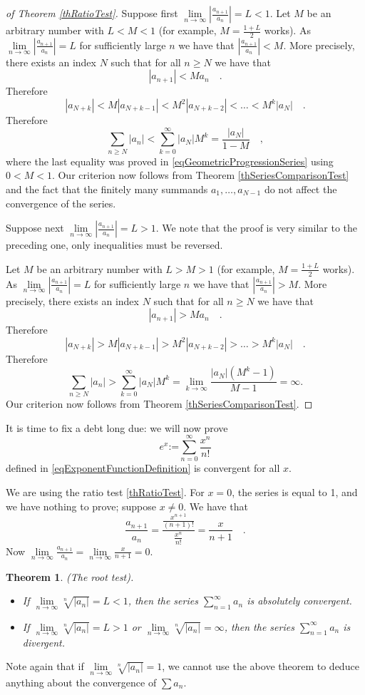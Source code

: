 \documentclass[12pt]{book}
\newcommand{\eqdef}{\textbf{:=}}
\newtheorem{theorem}{Theorem}[section]
\begin{document}
\begin{proof}[ of Theorem \ref{thRatioTest}]
Suppose first $\lim\limits_{n\to\infty}\left|\frac{a_{n+1}}{a_{n}}\right|= L<1 $. Let $M$ be an arbitrary number with $L<M<1$ (for example, $M=\frac{1+L}2$ works). As $\lim\limits_{n\to\infty}\left|\frac{a_{n+1}}{a_{n}}\right|=L$ for sufficiently large $n$ we have that $\left|\frac{a_{n+1}}{a_{n}} \right|< M$. More precisely, there exists an index $N$ such that for all $n\geq N$ we have that
\[
|a_{n+1}|< Ma_{n}\quad .
\]
Therefore
\[
|a_{N+k}|<M |a_{N+k-1}|< M^2 |a_{N+k-2}|<\dots <M^k |a_N|\quad .
\]
Therefore
\[
\sum_{n\geq N} |a_{n}|<\sum_{k=0}^{\infty} |a_N|M^{k}= \frac{|a_N|}{1-M}\quad ,
\]
where the last equality was proved in \eqref{eqGeometricProgressionSeries} using $0<M<1$. Our criterion now follows from Theorem \ref{thSeriesComparisonTest} and the fact that the finitely many summands $a_1, \dots, a_{N-1}$ do not affect the convergence of the series.

Suppose next $\lim\limits_{n\to\infty}\left|\frac{a_{n+1}}{a_{n}}\right|= L>1 $. We note that the proof is very similar to the preceding one, only inequalities must be reversed.

Let $M$ be an arbitrary number with $L>M>1$ (for example, $M=\frac{1+L}2$ works). As $\lim\limits_{n\to\infty} \left| \frac{a_{n+1}}{a_{n}} \right|=L$ for sufficiently large $n$ we have that $\left|\frac{a_{n+1}}{a_{n}} \right|> M$. More precisely, there exists an index $N$ such that for all $n\geq N$ we have that
\[
|a_{n+1}|> Ma_{n}\quad .
\]
Therefore
\[
|a_{N+k}|>M |a_{N+k-1}|> M^2 |a_{N+k-2}|>\dots >M^k |a_N|\quad .
\]
Therefore
\[
\sum_{n\geq N} |a_{n}|>\sum_{k=0}^{\infty} |a_N|M^{k}= \lim_{k\to \infty} \frac{|a_N|(M^k-1)}{M-1}=\infty.
\]
Our criterion now follows from Theorem \ref{thSeriesComparisonTest}.
\end{proof}

 It is time to fix a debt long due: we will now prove
\[
e^x\eqdef \sum_{n=0}^\infty \frac{x^n}{n!}
\]
defined in \ref{eqExponentFunctionDefinition} is convergent for all $x$.

We are using the ratio test \ref{thRatioTest}. For $x=0$, the series is equal to 1, and we have nothing to prove; suppose $x\neq 0$.  We have that
\[
\frac{a_{n+1}}{a_{n}}= \frac{\frac{x^{n+1}}{(n+1)!}}{\frac{x^{n}}{n!}} = \frac{x}{n+1}\quad .
\]
Now $\lim\limits_{n\to \infty} \frac{a_{n+1}}{a_{n}}= \lim\limits_{n\to \infty} \frac{x}{n+1}=0$.

\begin{theorem}\label{thRootTest}(The root test). 
\begin{itemize}
\item If $\lim\limits_{n\to\infty}\sqrt[n]{|a_n|}= L<1$, then the series $\sum\limits_{n=1}^\infty a_n$ is absolutely convergent.
\item If $\lim\limits_{n\to\infty}\sqrt[n]{|a_n|}= L>1$ or $\lim\limits_{n\to\infty}\sqrt[n]{|a_n|}=\infty$, then the series $\sum\limits_{n=1}^\infty a_n$ is divergent.
\end{itemize}
\end{theorem}
Note again that if $\lim\limits_{n\to\infty}\sqrt[n]{|a_n|}= 1$, we cannot use the above theorem to deduce anything about the convergence of $\sum a_n$.
\end{document}
